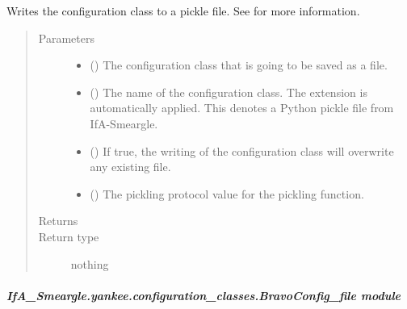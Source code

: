\documentclass[letterpaper,10pt,english]{sphinxmanual}
\begin{document}
\begin{fulllineitems}
\begin{fulllineitems}
Writes the configuration class to a pickle file. See
 for more information.
\begin{quote}\begin{description}
\item[{Parameters}] \leavevmode\begin{itemize}
\item {} 
 () \textendash{} The configuration class that is going to be saved as a file.

\item {} 
 () \textendash{} The name of the configuration class. The extension 
is automatically applied. This denotes a Python pickle file from
IfA-Smeargle.

\item {} 
 () \textendash{} If true, the writing of the configuration class will overwrite any
existing file.

\item {} 
 () \textendash{} The pickling protocol value for the pickling function.

\end{itemize}

\item[{Returns}] \leavevmode


\item[{Return type}] \leavevmode
nothing

\end{description}\end{quote}

\end{fulllineitems}


\end{fulllineitems}



\subparagraph{IfA\_Smeargle.yankee.configuration\_classes.BravoConfig\_file module}
\label{\detokenize{python_docstrings/IfA_Smeargle.yankee.configuration_classes.BravoConfig_file:module-IfA_Smeargle.yankee.configuration_classes.BravoConfig_file}}\label{\detokenize{python_docstrings/IfA_Smeargle.yankee.configuration_classes.BravoConfig_file:ifa-smeargle-yankee-configuration-classes-bravoconfig-file-module}}\label{\detokenize{python_docstrings/IfA_Smeargle.yankee.configuration_classes.BravoConfig_file::doc}}
\end{document}
